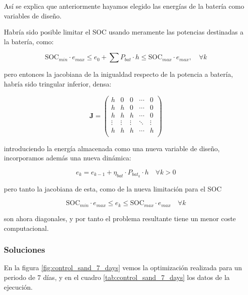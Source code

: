 Así se explica que anteriormente hayamos elegido las energías de la batería como variables
de diseño.

Habría sido posible limitar el SOC usando meramente las potencias destinadas a
la batería, como:

\begin{equation}
	\text{SOC}_{min} \cdot e_{max} \leq e_0 + \sum P_{bat} \cdot h \leq \text{SOC}_{max} \cdot e_{max}, \quad \forall k
\end{equation}

pero entonces la jacobiana de la inigualdad respecto de la potencia a batería,
habría sido tringular inferior, densa:

\begin{equation}
	\mathbf{J} =
	\begin{pmatrix}
		h      & 0      & 0      & \cdots & 0      \\
		h      & h      & 0      & \cdots & 0      \\
		h      & h      & h      & \cdots & 0      \\
		\vdots & \vdots & \vdots & \ddots & \vdots \\
		h      & h      & h      & \cdots & h      \\
	\end{pmatrix}
\end{equation}

introduciendo la energía almacenada como una nueva variable de diseño, incorporamos
además una nueva dinámica:

\begin{equation}
	e_k = e_{k-1} + \eta_{bat} \cdot P_{bat_k} \cdot h \quad \forall k > 0
\end{equation}

pero tanto la jacobiana de esta, como de la nueva limitación para el SOC

\begin{equation}
	\text{SOC}_{min} \cdot e_{max} \leq e_k \leq \text{SOC}_{max} \cdot e_{max} \quad \forall k
\end{equation}

son ahora diagonales, y por tanto el problema resultante tiene un menor coste
computacional.

\subsubsection{Soluciones}

En la figura \ref{fig:control_sand_7_days} vemos la optimización realizada para
un periodo de 7 días, y en el cuadro \ref{tab:control_sand_7_days} los
datos de la ejecución.

